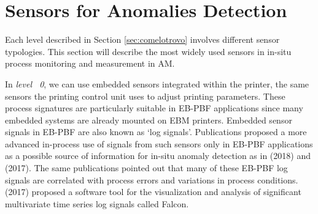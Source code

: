 

\section{Sensors for Anomalies Detection}
\label{sec:sensoriniiniini}
Each level described in Section \ref{sec:comelotrovo} involves different sensor typologies. This section will describe the most widely used sensors in in-situ process monitoring and measurement in AM. 

In \emph{level ~0}, we can use embedded sensors integrated within the printer, the same sensors the printing control unit uses to adjust printing parameters. These process signatures are particularly suitable in EB-PBF applications since many embedded systems are already mounted on EBM printers. Embedded sensor signals in EB-PBF are also known as ‘log signals’. Publications proposed a more advanced in-process use of signals from such sensors only in EB-PBF applications as a possible source of information for in-situ anomaly detection as in \citeauthor{grasso_data_2018} (2018) and \citeauthor{steed_falcon_2017} (2017). The same publications pointed out that many of these EB-PBF log signals are correlated with process errors and variations in process conditions. \citeauthor{steed_falcon_2017} (2017) proposed a software tool for the visualization and analysis of significant multivariate time series log signals called Falcon. 

